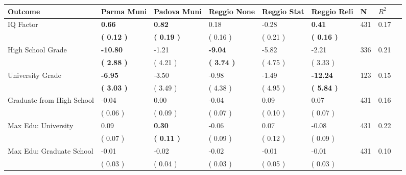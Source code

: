 \begin{tabular}{L{6.2cm} C{1.8cm} C{1.8cm} C{1.8cm} C{1.8cm} C{1.8cm} C{1.8cm} C{0.3cm} C{0.3cm}}
\toprule
 \textbf{Outcome} & \textbf{Parma Muni} & \textbf{Padova Muni} & \textbf{Reggio None} & \textbf{Reggio Stat} & \textbf{Reggio Reli} & \textbf{N} & \textbf{$ R^2$} \\
\midrule
IQ Factor & \textbf{     0.66} & \textbf{     0.82} &      0.18 &     -0.28 & \textbf{     0.41}  & 431 &       0.17 \\ 
 & \textbf{(     0.12 )} & \textbf{(     0.19 )} & (     0.16 ) & (     0.21 ) & \textbf{(     0.16 )}  & \\
High School Grade & \textbf{   -10.80} &     -1.21 & \textbf{    -9.04} &     -5.82 &     -2.21  & 336 &       0.21 \\ 
 & \textbf{(     2.88 )} & (     4.21 ) & \textbf{(     3.74 )} & (     4.75 ) & (     3.33 )  & \\
University Grade & \textbf{    -6.95} &     -3.50 &     -0.98 &     -1.49 & \textbf{   -12.24}  & 123 &       0.15 \\ 
 & \textbf{(     3.03 )} & (     3.49 ) & (     4.38 ) & (     4.95 ) & \textbf{(     5.84 )}  & \\
Graduate from High School &     -0.04 &      0.00 &     -0.04 &      0.09 &      0.07  & 431 &       0.16 \\ 
 & (     0.06 ) & (     0.09 ) & (     0.07 ) & (     0.10 ) & (     0.07 )  & \\
Max Edu: University &      0.09 & \textbf{     0.30} &     -0.06 &      0.07 &     -0.08  & 431 &       0.22 \\ 
 & (     0.07 ) & \textbf{(     0.11 )} & (     0.09 ) & (     0.12 ) & (     0.09 )  & \\
Max Edu: Graduate School &     -0.01 &     -0.02 &     -0.02 &     -0.01 &     -0.01  & 431 &       0.10 \\ 
 & (     0.03 ) & (     0.04 ) & (     0.03 ) & (     0.05 ) & (     0.03 )  & \\
\bottomrule
\end{tabular}
